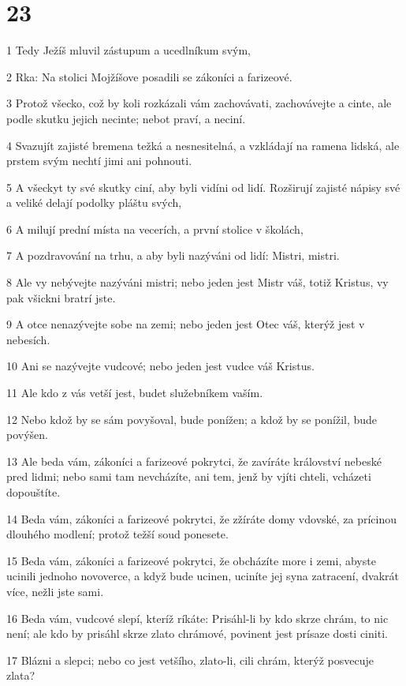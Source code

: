 \chapter{23}

\par 1 Tedy Ježíš mluvil zástupum a ucedlníkum svým,
\par 2 Rka: Na stolici Mojžíšove posadili se zákoníci a farizeové.
\par 3 Protož všecko, což by koli rozkázali vám zachovávati, zachovávejte a cinte, ale podle skutku jejich necinte; nebot praví, a neciní.
\par 4 Svazujít zajisté bremena težká a nesnesitelná, a vzkládají na ramena lidská, ale prstem svým nechtí jimi ani pohnouti.
\par 5 A všeckyt ty své skutky ciní, aby byli vidíni od lidí. Rozširují zajisté nápisy své a veliké delají podolky pláštu svých,
\par 6 A milují prední místa na vecerích, a první stolice v školách,
\par 7 A pozdravování na trhu, a aby byli nazýváni od lidí: Mistri, mistri.
\par 8 Ale vy nebývejte nazýváni mistri; nebo jeden jest Mistr váš, totiž Kristus, vy pak všickni bratrí jste.
\par 9 A otce nenazývejte sobe na zemi; nebo jeden jest Otec váš, kterýž jest v nebesích.
\par 10 Ani se nazývejte vudcové; nebo jeden jest vudce váš Kristus.
\par 11 Ale kdo z vás vetší jest, budet služebníkem vaším.
\par 12 Nebo kdož by se sám povyšoval, bude ponížen; a kdož by se ponížil, bude povýšen.
\par 13 Ale beda vám, zákoníci a farizeové pokrytci, že zavíráte království nebeské pred lidmi; nebo sami tam nevcházíte, ani tem, jenž by vjíti chteli, vcházeti dopouštíte.
\par 14 Beda vám, zákoníci a farizeové pokrytci, že zžíráte domy vdovské, za prícinou dlouhého modlení; protož težší soud ponesete.
\par 15 Beda vám, zákoníci a farizeové pokrytci, že obcházíte more i zemi, abyste ucinili jednoho novoverce, a když bude ucinen, uciníte jej syna zatracení, dvakrát více, nežli jste sami.
\par 16 Beda vám, vudcové slepí, kteríž ríkáte: Prisáhl-li by kdo skrze chrám, to nic není; ale kdo by prisáhl skrze zlato chrámové, povinent jest prísaze dosti ciniti.
\par 17 Blázni a slepci; nebo co jest vetšího, zlato-li, cili chrám, kterýž posvecuje zlata?
